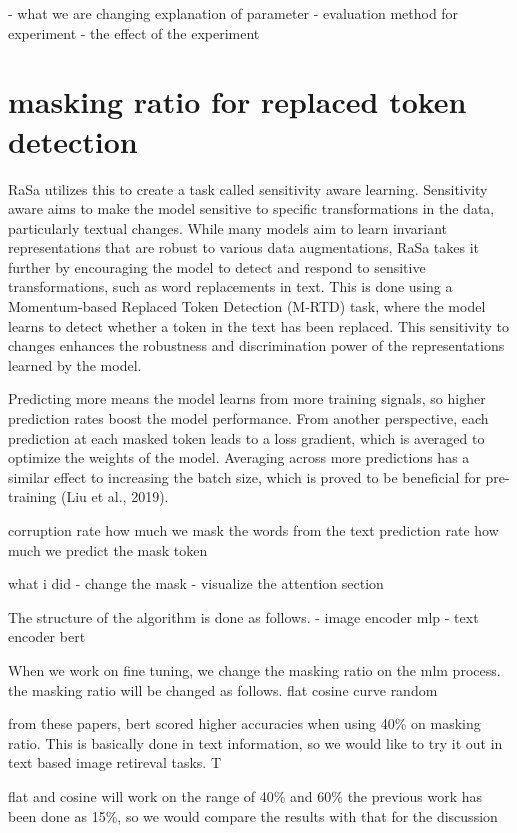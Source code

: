 - what we are changing  explanation of parameter
- evaluation method for experiment
- the effect of the experiment 


\section{masking ratio for replaced token detection}
RaSa utilizes this to create a task called sensitivity aware learning.
Sensitivity aware aims to make the model sensitive to specific transformations in the data, particularly textual changes. While many models aim to learn invariant representations that are robust to various data augmentations, RaSa takes it further by encouraging the model to detect and respond to sensitive transformations, such as word replacements in text. This is done using a Momentum-based Replaced Token Detection (M-RTD) task, where the model learns to detect whether a token in the text has been replaced. This sensitivity to changes enhances the robustness and discrimination power of the representations learned by the model.


Predicting more means the model learns from more training signals, so higher prediction rates boost the model performance. From another perspective, each prediction at each masked token leads to a loss gradient, which is averaged to optimize the weights of the model. Averaging across more predictions has a similar effect to increasing the batch size, which is proved to be beneficial for pre-training (Liu et al., 2019). 


corruption rate how much we mask the words from the text
prediction rate how much we predict the mask token 


what i did 
- change the mask 
- visualize the attention section

The structure of the algorithm is done as follows. 
- image encoder
  mlp 
- text encoder
  bert 

When we work on fine tuning, we change the masking ratio on the mlm process. 
the masking ratio will be changed as follows.
flat 
cosine curve 
random 

from these papers, bert scored higher accuracies when using 40\% on masking ratio. This is basically done in text information, 
so we would like to try it out in text based image retireval tasks. T

flat and cosine will work on the range of 40\% and 60\% 
the previous work has been done as 15\%, so we would compare the results with that for the discussion 

